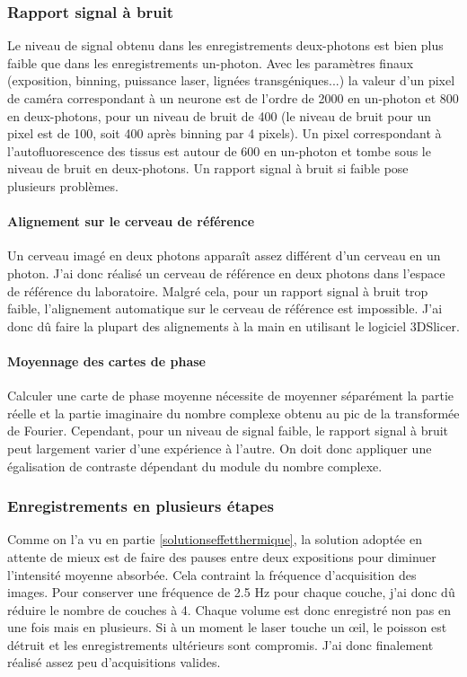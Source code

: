 \subsubsection{Rapport signal à bruit}
Le niveau de signal obtenu dans les enregistrements deux-photons est bien plus faible que dans les enregistrements un-photon. Avec les paramètres finaux (exposition, binning, puissance laser, lignées transgéniques...) la valeur d'un pixel de caméra correspondant à un neurone est de l'ordre de 2000 en un-photon et 800 en deux-photons, pour un niveau de bruit de 400 (le niveau de bruit pour un pixel est de 100, soit 400 après binning par 4 pixels). Un pixel correspondant à l'autofluorescence des tissus est autour de 600 en un-photon et tombe sous le niveau de bruit en deux-photons. Un rapport signal à bruit si faible pose plusieurs problèmes.
\paragraph{Alignement sur le cerveau de référence}
Un cerveau imagé en deux photons apparaît assez différent d'un cerveau en un photon. J'ai donc réalisé un cerveau de référence en deux photons dans l'espace de référence du laboratoire. Malgré cela, pour un rapport signal à bruit trop faible, l'alignement automatique sur le cerveau de référence est impossible. J'ai donc dû faire la plupart des alignements à la main en utilisant le logiciel 3DSlicer.
\paragraph{Moyennage des cartes de phase}
Calculer une carte de phase moyenne nécessite de moyenner séparément la partie réelle et la partie imaginaire du nombre complexe obtenu au pic de la transformée de Fourier. Cependant, pour un niveau de signal faible, le rapport signal à bruit peut largement varier d'une expérience à l'autre. On doit donc appliquer une égalisation de contraste dépendant du module du nombre complexe.

\subsubsection{Enregistrements en plusieurs étapes}
Comme on l'a vu en partie \ref{solutionseffetthermique}, la solution adoptée en attente de mieux est de faire des pauses entre deux expositions pour diminuer l'intensité moyenne absorbée. Cela contraint la fréquence d'acquisition des images. Pour conserver une fréquence de 2.5 Hz pour chaque couche, j'ai donc dû réduire le nombre de couches à 4. Chaque volume est donc enregistré non pas en une fois mais en plusieurs. Si à un moment le laser touche un œil, le poisson est détruit et les enregistrements ultérieurs sont compromis. J'ai donc finalement réalisé assez peu d'acquisitions valides.

